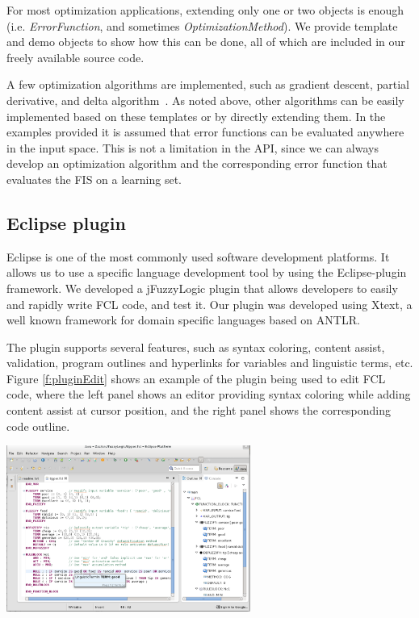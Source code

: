 \documentclass[11pt,twoside]{article}
\begin{document}
\begin{multicols}{2}
For most optimization applications, extending only one or two objects is enough (i.e. \textit{ErrorFunction}, and sometimes \textit{OptimizationMethod}). We provide template and demo objects to show how this can be done, all of which are included in our freely available source code.

A few optimization algorithms are implemented, such as gradient descent, partial derivative, and delta algorithm~\cite{hart2001pattern}. As noted above, other algorithms can be easily implemented based on these templates or by directly extending them. In the examples provided it is assumed that error functions can be evaluated anywhere in the input space. This is not a limitation in the API, since we can always develop an optimization algorithm and the corresponding error function that evaluates the FIS on a learning set.

\subsection{Eclipse plugin\label{sec:pluggin}}

Eclipse is one of the most commonly used software development platforms. It allows us to use a specific language development tool by using the Eclipse-plugin framework. We developed a jFuzzyLogic plugin that allows developers to easily and rapidly write FCL code, and test it. Our plugin was developed using Xtext, a well known framework for domain specific languages based on ANTLR.

The plugin supports several features, such as syntax coloring, content assist, validation, program outlines and hyperlinks for variables and linguistic terms, etc. Figure \ref{f:pluginEdit} shows an example of the plugin being used to edit FCL code, where the left panel shows an editor providing syntax coloring while adding content assist at cursor position, and the right panel shows the corresponding code outline. 

\vspace*{7pt}
\centerline{\includegraphics[width=3.15in]{./figs/plugin_edit}}
\vspace*{3pt}
\label{f:pluginEdit}
\vspace*{5pt}


\end{multicols}
\end{document}
